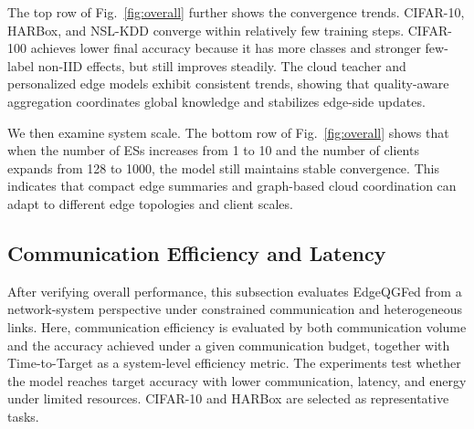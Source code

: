 ﻿\documentclass[10pt, conference, letterpaper]{ IEEEtran}
\begin{document}
The top row of Fig.~\ref{fig:overall} further shows the convergence trends. CIFAR-10, HARBox, and NSL-KDD converge within relatively few training steps. CIFAR-100 achieves lower final accuracy because it has more classes and stronger few-label non-IID effects, but still improves steadily. The cloud teacher and personalized edge models exhibit consistent trends, showing that quality-aware aggregation coordinates global knowledge and stabilizes edge-side updates.

We then examine system scale. The bottom row of Fig.~\ref{fig:overall} shows that when the number of ESs increases from 1 to 10 and the number of clients expands from 128 to 1000, the model still maintains stable convergence. This indicates that compact edge summaries and graph-based cloud coordination can adapt to different edge topologies and client scales.

\subsection{Communication Efficiency and Latency}
\label{subsec:comm_efficiency}
After verifying overall performance, this subsection evaluates EdgeQGFed from a network-system perspective under constrained communication and heterogeneous links. Here, communication efficiency is evaluated by both communication volume and the accuracy achieved under a given communication budget, together with Time-to-Target as a system-level efficiency metric. The experiments test whether the model reaches target accuracy with lower communication, latency, and energy under limited resources. CIFAR-10 and HARBox are selected as representative tasks.
\end{document}
